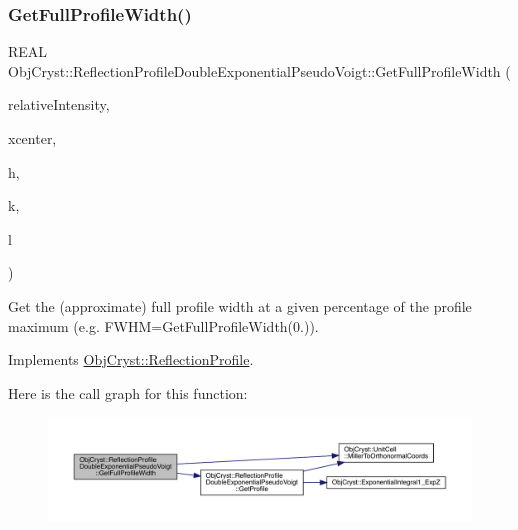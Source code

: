 \subsubsection{\texorpdfstring{GetFullProfileWidth()}{GetFullProfileWidth()}}
{\footnotesize\ttfamily R\+E\+AL Obj\+Cryst\+::\+Reflection\+Profile\+Double\+Exponential\+Pseudo\+Voigt\+::\+Get\+Full\+Profile\+Width (\begin{DoxyParamCaption}\item[{const R\+E\+AL}]{relative\+Intensity,  }\item[{const R\+E\+AL}]{xcenter,  }\item[{const R\+E\+AL}]{h,  }\item[{const R\+E\+AL}]{k,  }\item[{const R\+E\+AL}]{l }\end{DoxyParamCaption})\hspace{0.3cm}{\ttfamily [virtual]}}

Get the (approximate) full profile width at a given percentage of the profile maximum (e.\+g. F\+W\+HM=Get\+Full\+Profile\+Width(0.)). 

Implements \mbox{\hyperlink{class_obj_cryst_1_1_reflection_profile_ac6d2a69e63c3efd06f30ab134062bbc0}{Obj\+Cryst\+::\+Reflection\+Profile}}.

Here is the call graph for this function\+:
\nopagebreak
\begin{figure}[H]
\begin{center}
\leavevmode
\includegraphics[width=350pt]{class_obj_cryst_1_1_reflection_profile_double_exponential_pseudo_voigt_a92a2e4fd2b10e0edc07b338b79b59418_cgraph}
\end{center}
\end{figure}
\mbox{\label{class_obj_cryst_1_1_reflection_profile_double_exponential_pseudo_voigt_a4673785fae1ffdcc0a9c2402e8c4af8b}} 
